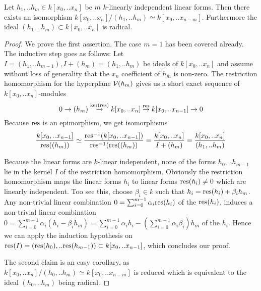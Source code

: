 
\begin{corollary} \label{corollaryRadical}
Let $h_1,.. h_m \in k[x_0,..x_n]$ be $m$ $k$-linearly independent linear forms.
Then there exists an isomorphism $k[x_0,..x_n]/(h_1,..h_m) \simeq k[x_0,..x_{n-m}]$.
Furthermore the ideal $(h_1,..h_m)\subset k[x_0,..x_n]$ is radical.
\end{corollary}
\begin{proof}
We prove the first assertion.
The case $m=1$ has been covered already.
The inductive step goes as follows:
Let $I = (h_1,..h_{m-1}), I+(h_m) = (h_1,..h_m)$ be ideals of $k[x_0,..x_n]$ and assume without loss of generality that the $x_n$ coefficient of $h_m$ is non-zero.
The restriction homomorphism for the hyperplane $\operatorname{\mathcal V}(h_m)$ gives us a short exact sequence of $k[x_0,..x_n]$-modules
\begin{equation}
0 \to (h_m) \overset{\ker({\operatorname{res}})}\to k[x_0,..x_n] \overset{{\operatorname{res}}}\to k[x_0,..x_{n-1}] \to 0
\end{equation}
Because ${\operatorname{res}}$ is an epimorphism, we get isomorphisms
\begin{equation}
\frac{k[x_0,..x_{n-1}]}{{\operatorname{res}}((h_m))}
\simeq \frac{{\operatorname{res}}^{-1}(k[x_0,..x_{n-1}])}{{\operatorname{res}}^{-1}({\operatorname{res}}((h_m))}
= \frac{k[x_0,..x_n]}{I+(h_m)}
= \frac{k[x_0,..x_n]}{(h_1,..h_m)}
\end{equation}

Because the linear forms are $k$-linear independent, none of the forms $h_0,..h_{m-1}$ lie in the kernel $I$ of the restriction homomorphism.
Obviously the restriction homomorphism maps the linear forms $h_i$ to linear forms ${\operatorname{res}}(h_i) \neq 0$ which are linearly independent.
Too see this, choose $\beta_i \in k$ such that $h_i = {\operatorname{res}}(h_i) + \beta_i h_m$.
Any non-trivial linear combination $0 = \sum_{i=0}^{m-1} \alpha_i {\operatorname{res}}(h_i)$ of the ${\operatorname{res}}(h_i)$, induces a non-trivial linear combination $0 = \sum_{i=0}^{m-1} \alpha_i(h_i - \beta_i h_m) = \sum_{i=0}^{m-1}\alpha_i h_i - (\sum_{i=0}^{m-1} \alpha_i\beta_i)h_m$ of the $h_i$.
Hence we can apply the induction hypothesis on ${\operatorname{res}}(I) = ({\operatorname{res}}(h_0),..{\operatorname{res}}(h_{m-1})) \subset k[x_0,..x_{n-1}]$, which concludes our proof.


The second claim is an easy corollary, as $k[x_0,..x_n]/(h_0,..h_m) \simeq k[x_0,..x_{n-m}]$ is reduced which is equivalent to the ideal $(h_0,..h_m)$ being radical.

\end{proof}


